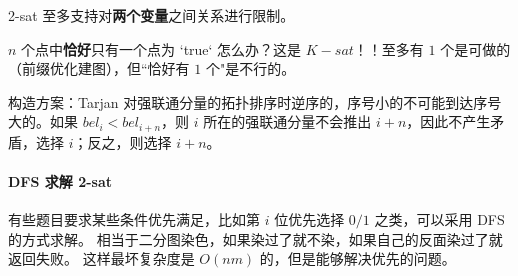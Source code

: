 2-sat 至多支持对\textbf{两个变量}之间关系进行限制。

$n$ 个点中\textbf{恰好}只有一个点为 `true` 怎么办？这是 $K-sat$！！至多有 $1$ 个是可做的（前缀优化建图），但“恰好有 $1$ 个"是不行的。

构造方案：Tarjan 对强联通分量的拓扑排序时逆序的，序号小的不可能到达序号大的。如果 $bel_i<bel_{i+n}$，则 $i$ 所在的强联通分量不会推出 $i+n$，因此不产生矛盾，选择 $i$；反之，则选择 $i+n$。

\paragraph{DFS 求解 2-sat}
有些题目要求某些条件优先满足，比如第 $i$ 位优先选择 $0/1$ 之类，可以采用 DFS 的方式求解。
相当于二分图染色，如果染过了就不染，如果自己的反面染过了就返回失败。
这样最坏复杂度是 $O(nm)$ 的，但是能够解决优先的问题。